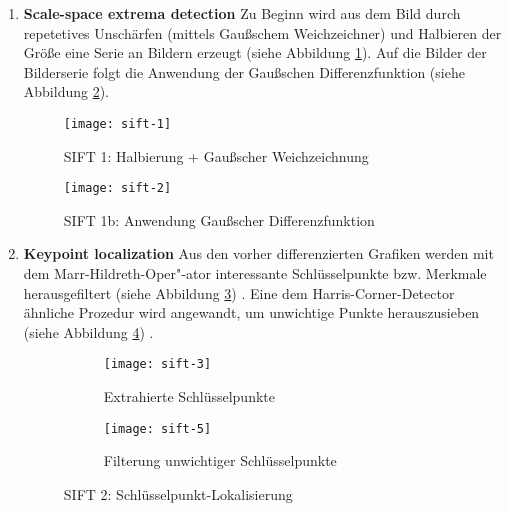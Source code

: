 \begin{enumerate}
    \item \textbf{Scale-space extrema detection}\newline
    Zu Beginn wird aus dem Bild durch repetetives Unschärfen (mittels
    Gaußschem Weichzeichner) und Halbieren der Größe eine Serie an Bildern
    erzeugt (siehe Abbildung \ref{fig:sift1}). Auf die Bilder der Bilderserie
    folgt die Anwendung der Gaußschen Differenzfunktion (siehe Abbildung
    \ref{fig:sift2}). \parencite{sift-web-scale-space}

    \begin{figure}[H]
        \centering
        \texttt{[image: sift-1]}
        \caption{SIFT 1: Halbierung + Gaußscher Weichzeichnung}
        \label{fig:sift1}
    \end{figure}

    \begin{figure}[H]
        \centering
        \texttt{[image: sift-2]}
        \caption{SIFT 1b: Anwendung Gaußscher Differenzfunktion}
        \label{fig:sift2}
    \end{figure}

    \item \textbf{Keypoint localization}\newline
    Aus den vorher differenzierten Grafiken werden mit dem
    Marr-Hildreth-Oper"-ator interessante Schlüsselpunkte bzw. Merkmale
    herausgefiltert (siehe Abbildung \ref{fig:sift3})
    \parencite{sift-web-keypoint}. Eine dem Harris-Corner-Detector ähnliche
    Prozedur wird angewandt, um unwichtige Punkte herauszusieben (siehe
    Abbildung \ref{fig:sift5}) \parencite{sift-web-low-contrast}.

    \begin{figure}[H]
        \centering
        \begin{subfigure}{.5\textwidth}
          \centering
          \texttt{[image: sift-3]}
          \caption{Extrahierte Schlüsselpunkte}
          \label{fig:sift3}
        \end{subfigure}%
        \begin{subfigure}{.5\textwidth}
          \centering
          \texttt{[image: sift-5]}
          \caption{Filterung unwichtiger Schlüsselpunkte}
          \label{fig:sift5}
        \end{subfigure}
        \caption{SIFT 2: Schlüsselpunkt-Lokalisierung}
        \label{fig:sift-keypoint}
    \end{figure}


\end{enumerate}
